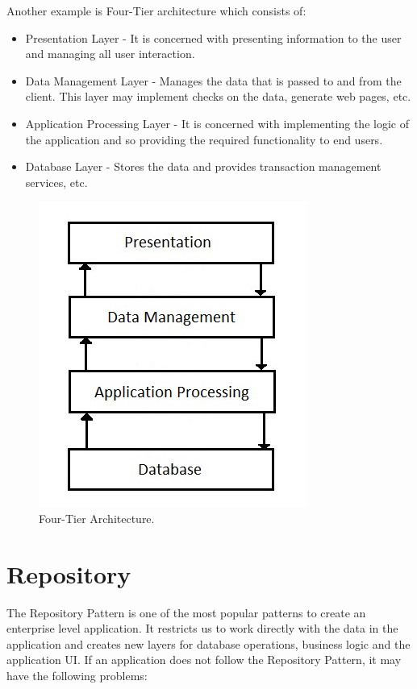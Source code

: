 \documentclass{article}
\begin{document}
\newpage
\noindent Another example is Four-Tier architecture which consists of:

\begin{itemize}

\item Presentation Layer - It is concerned with presenting information to the user and managing all user interaction.
\item Data Management Layer - Manages the data that is passed to and from the client. This layer may implement checks on the data, generate web pages, etc.
\item Application Processing Layer - It is concerned with implementing the logic of the application and so providing the required functionality to end users.
\item Database Layer - Stores the data and provides transaction management services, etc.

\end{itemize}

\begin{figure}[h]
\centering
\includegraphics[scale=0.9]{4t.jpg}
\caption{Four-Tier Architecture.}
\label{fig_4t}
\end{figure}

\section{Repository}
The Repository Pattern is one of the most popular patterns to create an enterprise level application. It restricts us to work directly with the data in the application and creates new layers for database operations, business logic and the application UI. If an application does not follow the Repository Pattern, it may have the following problems:
\end{document}
